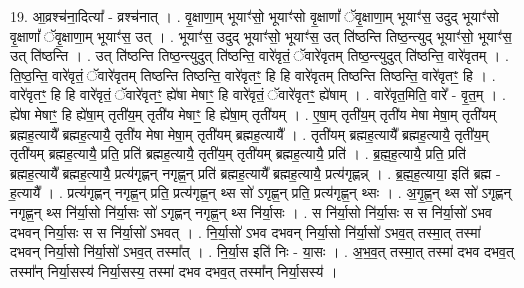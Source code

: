 \documentclass[17pt]{extarticle}
\begin{document}
19. आ॒व्रश्च॑ना॒दित्या᳚ - व्रश्च॑नात् । . वृ॒क्षाणा॒म् भूयाꣳ॑सो॒ भूयाꣳ॑सो वृ॒क्षाणां᳚ ॅवृ॒क्षाणा॒म् भूयाꣳ॑स॒ उदुद् भूयाꣳ॑सो वृ॒क्षाणां᳚ ॅवृ॒क्षाणा॒म् भूयाꣳ॑स॒ उत् । . भूयाꣳ॑स॒ उदुद् भूयाꣳ॑सो॒ भूयाꣳ॑स॒ उत् ति॑ष्ठन्ति तिष्ठ॒न्त्युद् भूयाꣳ॑सो॒ भूयाꣳ॑स॒ उत् ति॑ष्ठन्ति । . उत् ति॑ष्ठन्ति तिष्ठ॒न्त्युदुत् ति॑ष्ठन्ति॒ वारे॑वृतं॒ ॅवारे॑वृतम् तिष्ठ॒न्त्युदुत् ति॑ष्ठन्ति॒ वारे॑वृतम् । . ति॒ष्ठ॒न्ति॒ वारे॑वृतं॒ ॅवारे॑वृतम् तिष्ठन्ति तिष्ठन्ति॒ वारे॑वृतꣳ॒॒ हि हि वारे॑वृतम् तिष्ठन्ति तिष्ठन्ति॒ वारे॑वृतꣳ॒॒ हि । . वारे॑वृतꣳ॒॒ हि हि वारे॑वृतं॒ ॅवारे॑वृतꣳ॒॒ ह्ये॑षा मेषाꣳ॒॒ हि वारे॑वृतं॒ ॅवारे॑वृतꣳ॒॒ ह्ये॑षाम् । . वारे॑वृत॒मिति॒ वारे᳚ - वृ॒त॒म् । . ह्ये॑षा मेषाꣳ॒॒ हि ह्ये॑षा॒म् तृती॑य॒म् तृती॑य मेषाꣳ॒॒ हि ह्ये॑षा॒म् तृती॑यम् । . ए॒षा॒म् तृती॑य॒म् तृती॑य मेषा मेषा॒म् तृती॑यम् ब्रह्मह॒त्यायै᳚ ब्रह्मह॒त्यायै॒ तृती॑य मेषा मेषा॒म् तृती॑यम् ब्रह्मह॒त्यायै᳚ । . तृती॑यम् ब्रह्मह॒त्यायै᳚ ब्रह्मह॒त्यायै॒ तृती॑य॒म् तृती॑यम् ब्रह्मह॒त्यायै॒ प्रति॒ प्रति॑ ब्रह्मह॒त्यायै॒ तृती॑य॒म् तृती॑यम् ब्रह्मह॒त्यायै॒ प्रति॑ । . ब्र॒ह्म॒ह॒त्यायै॒ प्रति॒ प्रति॑ ब्रह्मह॒त्यायै᳚ ब्रह्मह॒त्यायै॒ प्रत्य॑गृह्णन् नगृह्ण॒न् प्रति॑ ब्रह्मह॒त्यायै᳚ ब्रह्मह॒त्यायै॒ प्रत्य॑गृह्णन्न् । . ब्र॒ह्म॒ह॒त्याया॒ इति॑ ब्रह्म - ह॒त्यायै᳚ । . प्रत्य॑गृह्णन् नगृह्ण॒न् प्रति॒ प्रत्य॑गृह्ण॒न् थ्स सो॑ ऽगृह्ण॒न् प्रति॒ प्रत्य॑गृह्ण॒न् थ्सः । . अ॒गृ॒ह्ण॒न् थ्स सो॑ ऽगृह्णन् नगृह्ण॒न् थ्स नि॑र्या॒सो नि॑र्या॒सः सो॑ ऽगृह्णन् नगृह्ण॒न् थ्स नि॑र्या॒सः । . स नि॑र्या॒सो नि॑र्या॒सः स स नि॑र्या॒सो॑ ऽभव दभवन् निर्या॒सः स स नि॑र्या॒सो॑ ऽभवत् । . नि॒र्या॒सो॑ ऽभव दभवन् निर्या॒सो नि॑र्या॒सो॑ ऽभव॒त् तस्मा॒त् तस्मा॑ दभवन् निर्या॒सो नि॑र्या॒सो॑ ऽभव॒त् तस्मा᳚त् । . नि॒र्या॒स इति॑ निः - या॒सः । . अ॒भ॒व॒त् तस्मा॒त् तस्मा॑ दभव दभव॒त् तस्मा᳚न् निर्या॒सस्य॑ निर्या॒सस्य॒ तस्मा॑ दभव दभव॒त् तस्मा᳚न् निर्या॒सस्य॑ । \newline
\end{document}
